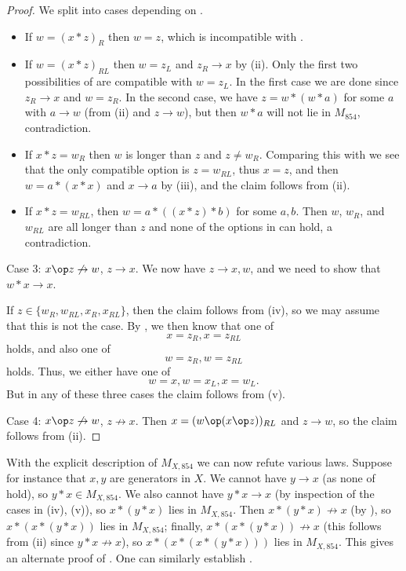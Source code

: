 \begin{proof}
We split into cases depending on .
\begin{itemize}
\item If $w = (x*z)_R$ then $w=z$, which is incompatible with .
\item If $w = (x*z)_{RL}$ then $w = z_L$ and $z_R \to x$ by (ii). Only the first two possibilities of  are compatible with $w=z_L$.  In the first case we are done since $z_R \to x$ and $w = z_R$.  In the second case, we have $z = w * (w * a)$ for some $a$ with $a \to w$ (from (ii) and $z \to w$), but then $w * a$ will not lie in $M_{854}$, contradiction.
\item If $x*z = w_R$  then $w$ is longer than $z$ and $z \neq w_R$.  Comparing this with  we see that the only compatible option is $z = w_{RL}$, thus $x=z$, and then $w = a * (x * x)$ and $x \to a$ by (iii), and the claim follows from (ii).
\item If $x * z = w_{RL}$, then $w = a * ((x *z) * b)$ for some $a,b$.  Then $w$, $w_R$, and $w_{RL}$ are all longer than $z$ and none of the options in  can hold, a contradiction.
\end{itemize}



Case 3: $x \op z \not \to w$, $z \to x$.  We now have $z \to x, w$, and we need to show that $w * x \to x$.

If $z \in \{ w_R, w_{RL}, x_R, x_{RL} \}$, then the claim follows from (iv), so we may assume that this is not the case.
By , we then know that one of
$$ x = z_R, x = z_{RL}$$
holds, and also one of
$$
 w =  z_R, w = z_{RL}$$
 holds. Thus, we either have one of
$$ w = x, w = x_L, x = w_L.$$
But in any of these three cases the claim follows from (v).

Case 4: $x \op z \not \to w$, $z \not \to x$.  Then $x = (w \op (x \op z))_{RL}$ and $z \to w$, so the claim follows from (ii).

\end{proof}

With the explicit description of $M_{X,854}$ we can now refute various laws.  Suppose for instance that $x,y$ are generators in $X$.  We cannot have $y \to x$ (as none of  hold), so $y * x \in M_{X,854}$.  We also cannot have $y * x \to x$ (by inspection of the cases in (iv), (v)), so $x * (y * x)$ lies in $M_{X,854}$.  Then $x * (y * x) \not \to x$ (by ), so $x * (x * (y * x))$ lies in $M_{X,854}$; finally, $x * (x * (y * x)) \not \to x$ (this follows from (ii) since $y * x \not \to x$), so $x * (x * (x * (y * x)))$ lies in $M_{X,854}$.  This gives an alternate proof of .  One can similarly establish .


